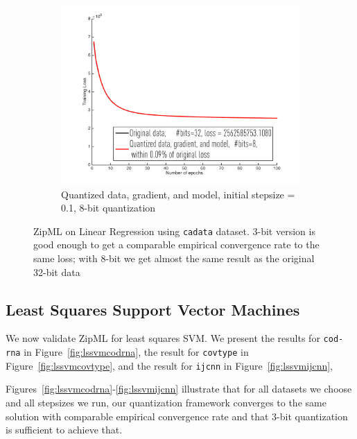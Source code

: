 \documentclass{article}
\begin{document}
\begin{figure}[h]
\begin{subfigure}[h]{.3\columnwidth}
    \includegraphics[width=\columnwidth]{lr/real/cadata/8dgm01}
     \caption{Quantized data, gradient, and model, initial stepsize = 0.1, 8-bit quantization}
    \end{subfigure}
    
\caption{ZipML on Linear Regression using \texttt{cadata} dataset. 3-bit version is good enough to get a comparable empirical convergence rate to the same loss; with 8-bit we get almost the same result as the original 32-bit data}
\label{fig:lrcadata}
\end{figure}



\subsection{Least Squares Support Vector Machines}

We now validate ZipML for least squares SVM.
We present the results for \texttt{cod-rna} in Figure~\ref{fig:lssvmcodrna}, the result for \texttt{covtype} in Figure~\ref{fig:lssvmcovtype}, and the result for \texttt{ijcnn} in Figure~\ref{fig:lssvmijcnn},

Figures~\ref{fig:lssvmcodrna}-\ref{fig:lssvmijcnn} illustrate that for all datasets we choose and all stepsizes we run, our quantization framework
converges to the same solution with comparable
empirical convergence rate and that 3-bit quantization is sufficient to achieve that.
\end{document}
